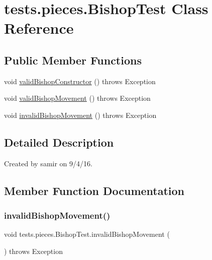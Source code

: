 \hypertarget{classtests_1_1pieces_1_1_bishop_test}{}\section{tests.\+pieces.\+Bishop\+Test Class Reference}
\label{classtests_1_1pieces_1_1_bishop_test}
\subsection*{Public Member Functions}
\begin{DoxyCompactItemize}
\item 
void \hyperlink{classtests_1_1pieces_1_1_bishop_test_a56e8b7b1d2be0b154ce7a51b3c2851a6}{valid\+Bishop\+Constructor} ()  throws Exception 
\item 
void \hyperlink{classtests_1_1pieces_1_1_bishop_test_a8237167f486fa797b996b55c726ad9cc}{valid\+Bishop\+Movement} ()  throws Exception 
\item 
void \hyperlink{classtests_1_1pieces_1_1_bishop_test_aad795e069e5b506f723c44d7b31fc794}{invalid\+Bishop\+Movement} ()  throws Exception 
\end{DoxyCompactItemize}


\subsection{Detailed Description}
Created by samir on 9/4/16. 

\subsection{Member Function Documentation}
\hypertarget{classtests_1_1pieces_1_1_bishop_test_aad795e069e5b506f723c44d7b31fc794}{}\label{classtests_1_1pieces_1_1_bishop_test_aad795e069e5b506f723c44d7b31fc794} 
\subsubsection{\texorpdfstring{invalid\+Bishop\+Movement()}{invalidBishopMovement()}}
{\footnotesize\ttfamily void tests.\+pieces.\+Bishop\+Test.\+invalid\+Bishop\+Movement (\begin{DoxyParamCaption}{ }\end{DoxyParamCaption}) throws Exception}

